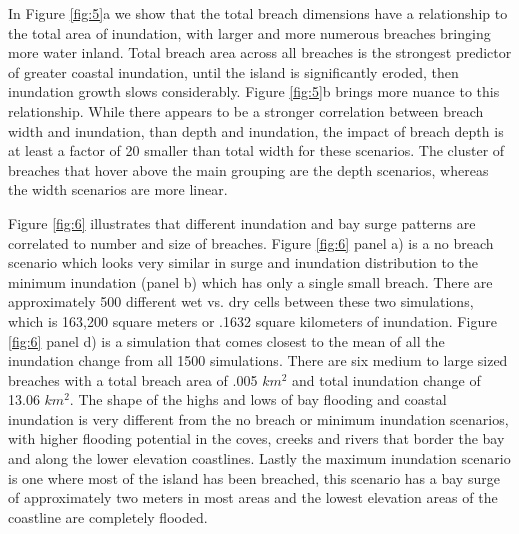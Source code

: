 \documentclass{coastal_paper}
\begin{document}
In Figure \ref{fig:5}a we show that the total breach dimensions have a relationship to the total area of inundation, with larger and more numerous breaches bringing more water inland. Total breach area across all breaches is the strongest predictor of greater coastal inundation, until the island is significantly eroded, then inundation growth slows considerably.
Figure \ref{fig:5}b brings more nuance to this relationship. While there appears to be a stronger correlation between breach width and inundation, than depth and inundation, the impact of breach depth is at least a factor of 20 smaller than total width for these scenarios. The cluster of breaches that hover above the main grouping are the depth scenarios, whereas the width scenarios are more linear.



Figure \ref{fig:6} illustrates that different inundation and bay surge patterns are correlated to number and size of breaches. Figure \ref{fig:6} panel a) is a no breach scenario which looks very similar in surge and inundation distribution to the minimum inundation (panel b) which has only a single small breach. There are approximately 500 different wet vs. dry cells between these two simulations, which is 163,200 square meters or .1632 square kilometers of inundation. Figure \ref{fig:6} panel d) is a simulation that comes closest to the mean of all the inundation change from all 1500 simulations. There are six medium to large sized breaches with a total breach area of .005 $km^2$ and total inundation change of 13.06 $km^2$. The shape of the highs and lows of bay flooding and coastal inundation is very different from the no breach or minimum inundation scenarios, with higher flooding potential in the coves, creeks and rivers that border the bay and along the lower elevation coastlines. Lastly the maximum inundation scenario is one where most of the island has been breached, this scenario has a bay surge of approximately two meters in most areas and the lowest elevation areas of the coastline are completely flooded.
\end{document}
